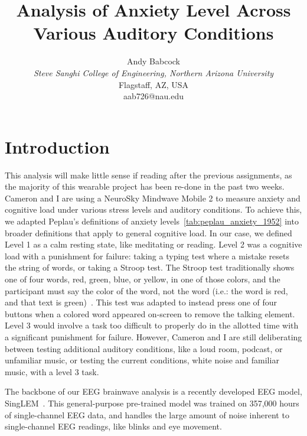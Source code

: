 \documentclass[journal]{IEEEtran}
\begin{document}
\title{Analysis of Anxiety Level Across Various Auditory Conditions}

\author{Andy Babcock \\
    \textit{Steve Sanghi College of Engineering, Northern Arizona University} \\
    Flagstaff, AZ, USA \\
    aab726@nau.edu
}

\maketitle

\section{Introduction}
This analysis will make little sense if reading after the previous assignments, as the majority of this wearable project has been re-done in the past two weeks. Cameron and I are using a NeuroSky Mindwave Mobile 2 to measure anxiety and cognitive load under various stress levels and auditory conditions. To achieve this, we adapted Peplau's definitions of anxiety levels~\ref{tab:peplau_anxiety_1952} into broader definitions that apply to general cognitive load. In our case, we defined Level 1 as a calm resting state, like meditating or reading. Level 2 was a cognitive load with a punishment for failure: taking a typing test where a mistake resets the string of words, or taking a Stroop test. The Stroop test traditionally shows one of four words, red, green, blue, or yellow, in one of those colors, and the participant must say the color of the word, not the word (i.e.: the word is red, and that text is green)~\cite{MacLeodColinM1991HaCo}. This test was adapted to instead press one of four buttons when a colored word appeared on-screen to remove the talking element. Level 3 would involve a task too difficult to properly do in the allotted time with a significant punishment for failure. However, Cameron and I are still deliberating between testing additional auditory conditions, like a loud room, podcast, or unfamiliar music, or testing the current conditions, white noise and familiar music, with a level 3 task.

The backbone of our EEG brainwave analysis is a recently developed EEG model, SingLEM~\cite{SukhbaatarJamiyan2025SSLE}. This general-purpose pre-trained model was trained on 357,000 hours of single-channel EEG data, and handles the large amount of noise inherent to single-channel EEG readings, like blinks and eye movement.
\end{document}

